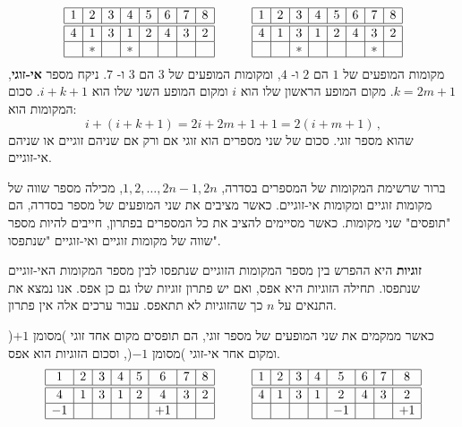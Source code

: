 \[
\begin{array}{|c|c|c|c|c|c|c|c|}
\hline
1&2&3&4&5&6&7&8\\
\hline\hline
4&1&3&1&2&4&3&2\\\hline
&*&&*&&&&\\\hline
\end{array}
\hspace{3em}
\begin{array}{|c|c|c|c|c|c|c|c|}
\hline
1&2&3&4&5&6&7&8\\
\hline\hline
4&1&3&1&2&4&3&2\\\hline
&&*&&&&*&\\\hline
\end{array}
\]
מקומות המופעים של
$1$
הם
$2$
ו-%
$4$,
ומקומות המופעים של
$3$
הם
$3$
ו-%
$7$.
ניקח מספר 
\textbf{אי-זוגי},
$k=2m+1$.
מקום המופע הראשון שלו הוא
$i$
ומקום המופע השני שלו הוא
$i+k+1$.
סכום המקומות הוא:
\[
i+(i+k+1)=2i+2m+1+1=2(i+m+1)\,,
\]
שהוא מספר זוגי.
סכום של שני מספרים הוא זוגי אם ורק אם שניהם זוגיים או שניהם אי-זוגיים.

ברור שרשימת המקומות של המספרים בסדרה,
$1,2,\ldots,2n-1,2n$,
מכילה מספר שווה של מקומות זוגיים ומקומות אי-זוגיים. כאשר מציבים את שני המופעים של מספר בסדרה, הם "תופסים" שני מקומות. כאשר מסיימים להציב את כל המספרים בפתרון, חייבים להיות מספר שווה של מקומות זוגיים ואי-זוגיים "שנתפסו".

\textbf{זוגיות}
היא ההפרש בין מספר המקומות הזוגיים שנתפסו לבין מספר המקומות האי-זוגיים שנתפסו. תחילה הזוגיות היא אפס, ואם יש פתרון זוגיות שלו גם כן אפס. אנו נמצא את התנאים על 
$n$ 
כך שהזוגיות לא תתאפס. עבור ערכים אלה אין פתרון.

כאשר ממקמים את שני המופעים של מספר זוגי, הם תופסים מקום אחד זוגי )מסומן 
$+1$(
ומקום אחר אי-זוגי )מסומן 
$-1$(,
וסכום הזוגיות הוא אפס.
\[
\begin{array}{|c|c|c|c|c|c|c|c|}
\hline
1&2&3&4&5&6&7&8\\
\hline\hline
4&1&3&1&2&4&3&2\\\hline
-1&&&&&+1&&\\\hline
\end{array}
\hspace{3em}
\begin{array}{|c|c|c|c|c|c|c|c|}
\hline
1&2&3&4&5&6&7&8\\
\hline\hline
4&1&3&1&2&4&3&2\\\hline
&&&&-1&&&+1\\\hline
\end{array}
\]

